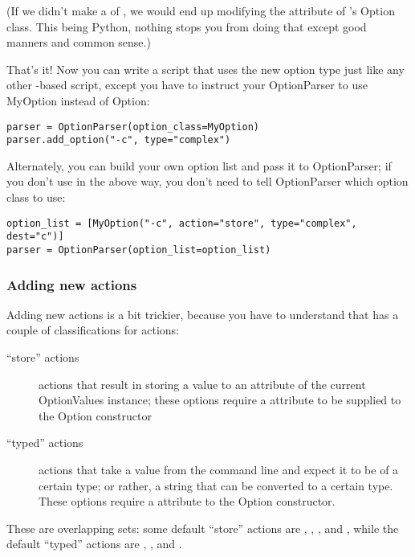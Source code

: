 (If we didn't make a  of , we would end
up modifying the  attribute of 's Option class.
This being Python, nothing stops you from doing that except good manners
and common sense.)

That's it!  Now you can write a script that uses the new option type
just like any other -based script, except you have to instruct your
OptionParser to use MyOption instead of Option:
\begin{verbatim}
parser = OptionParser(option_class=MyOption)
parser.add_option("-c", type="complex")
\end{verbatim}

Alternately, you can build your own option list and pass it to
OptionParser; if you don't use  in the above way, you
don't need to tell OptionParser which option class to use:
\begin{verbatim}
option_list = [MyOption("-c", action="store", type="complex", dest="c")]
parser = OptionParser(option_list=option_list)
\end{verbatim}


\subsubsection{Adding new actions\label{optparse-adding-new-actions}}

Adding new actions is a bit trickier, because you have to understand
that  has a couple of classifications for actions:
\begin{description}
\item[``store'' actions]
actions that result in  storing a value to an attribute of the
current OptionValues instance; these options require a 
attribute to be supplied to the Option constructor
\item[``typed'' actions]
actions that take a value from the command line and expect it to be
of a certain type; or rather, a string that can be converted to a
certain type.  These options require a  attribute to the
Option constructor.
\end{description}

These are overlapping sets: some default ``store'' actions are ,
, , and , while the default ``typed''
actions are , , and .


